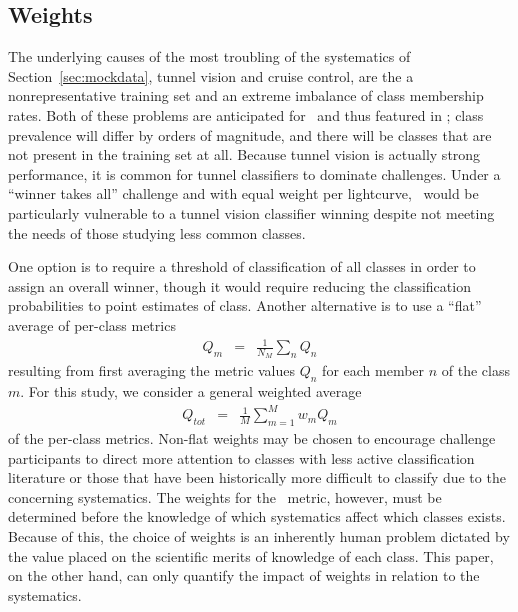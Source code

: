 %

\subsection{Weights}
\label{sec:weights}


The underlying causes of the most troubling of the systematics of Section~\ref{sec:mockdata}, tunnel vision and cruise control, are the a nonrepresentative training set and an extreme imbalance of class membership rates.
Both of these problems are anticipated for \lsst\ and thus featured in \plasticc; class prevalence will differ by orders of magnitude, and there will be classes that are not present in the training set at all.
Because tunnel vision is actually strong performance, it is common for tunnel classifiers to dominate challenges.
Under a ``winner takes all'' challenge and with equal weight per lightcurve, \plasticc\ would be particularly vulnerable to a tunnel vision classifier winning despite not meeting the needs of those studying less common classes.

One option is to require a threshold of classification of all classes in order to assign an overall winner, though it would require reducing the classification probabilities to point estimates of class.
Another alternative is to use a ``flat'' average of per-class metrics
\begin{eqnarray}
  \label{eq:perclassavg}
Q_{m} &=& \frac{1}{N_{M}}\sum_{n}Q_{n}
\end{eqnarray}
resulting from first averaging the metric values $Q_{n}$ for each member $n$ of the class $m$.
For this study, we consider a general weighted average
\begin{eqnarray}
  \label{eq:weightavg}
Q_{tot} &=& \frac{1}{M}\sum_{m=1}^{M}w_{m}Q_{m}
\end{eqnarray}
of the per-class metrics.
Non-flat weights may be chosen to encourage challenge participants to direct more attention to classes with less active classification literature or those that have been historically more difficult to classify due to the concerning systematics.
The weights for the \plasticc\ metric, however, must be determined before the knowledge of which systematics affect which classes exists.
Because of this, the choice of weights is an inherently human problem dictated by the value placed on the scientific merits of knowledge of each class.
This paper, on the other hand, can only quantify the impact of weights in relation to the systematics.
